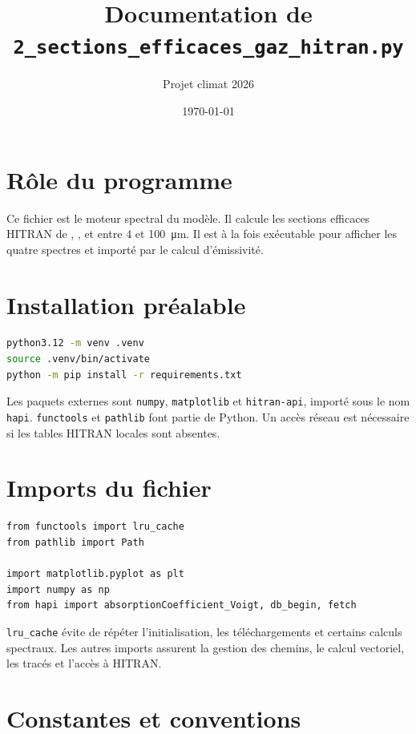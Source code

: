 \documentclass[11pt,a4paper]{article}
\title{Documentation de \texttt{2\_sections\_efficaces\_gaz\_hitran.py}}
\author{Projet climat 2026}
\date{\today}
\begin{document}
\maketitle
\tableofcontents

\section{Rôle du programme}

Ce fichier est le moteur spectral du modèle. Il calcule les sections efficaces
HITRAN de , ,  et  entre 4 et
\SI{100}{\micro\metre}. Il est à la fois exécutable pour afficher les quatre
spectres et importé par le calcul d'émissivité.

\section{Installation préalable}

\begin{lstlisting}[language=bash]
python3.12 -m venv .venv
source .venv/bin/activate
python -m pip install -r requirements.txt
\end{lstlisting}

Les paquets externes sont \texttt{numpy}, \texttt{matplotlib} et
\texttt{hitran-api}, importé sous le nom \texttt{hapi}. \texttt{functools} et
\texttt{pathlib} font partie de Python. Un accès réseau est nécessaire si les
tables HITRAN locales sont absentes.

\section{Imports du fichier}

\begin{lstlisting}
from functools import lru_cache
from pathlib import Path

import matplotlib.pyplot as plt
import numpy as np
from hapi import absorptionCoefficient_Voigt, db_begin, fetch
\end{lstlisting}

\texttt{lru\_cache} évite de répéter l'initialisation, les téléchargements et
certains calculs spectraux. Les autres imports assurent la gestion des chemins,
le calcul vectoriel, les tracés et l'accès à HITRAN.

\section{Constantes et conventions}
\end{document}

